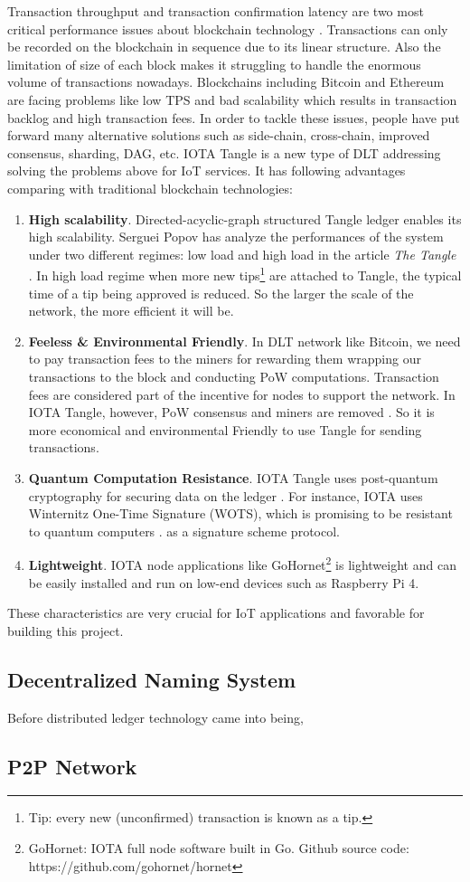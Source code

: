 Transaction throughput and transaction confirmation latency are two most critical performance issues about blockchain technology \cite{zhou2020solutions}. 
Transactions can only be recorded on the blockchain in sequence due to its linear structure. Also the limitation of size of each block makes it struggling to handle the enormous volume of transactions nowadays.
Blockchains including Bitcoin and Ethereum are facing problems like low TPS and bad scalability which results in transaction backlog and high transaction fees. 
In order to tackle these issues, people have put forward many alternative solutions such as side-chain, cross-chain, improved consensus, sharding, DAG, etc. 
IOTA Tangle is a new type of DLT addressing solving the problems above for IoT services. It has following advantages comparing with traditional blockchain technologies:

\begin{enumerate}
    \item \textbf{High scalability}. Directed-acyclic-graph structured Tangle ledger enables its high scalability. Serguei Popov has analyze the performances of the system under two different regimes: low load and high load in the article \textit{The Tangle} \cite{popov2018tangle}. In high load regime when more new tips\footnote{Tip: every new (unconfirmed) transaction is known as a tip.} are attached to Tangle, the typical time of a tip being approved is reduced. 
    So the larger the scale of the network, the more efficient it will be.
    \item \textbf{Feeless \& Environmental Friendly}. In DLT network like Bitcoin, we need to pay transaction fees to the miners for rewarding them wrapping our transactions to the block and conducting PoW computations. Transaction fees are considered part of the incentive for nodes to support the network. In IOTA Tangle, however, PoW consensus and miners are removed \cite{popov2019iota}. So it is more economical and environmental Friendly to use Tangle for sending transactions.
    \item \textbf{Quantum Computation Resistance}. IOTA Tangle uses post-quantum cryptography for securing data on the ledger \cite{tennant2017improving}. For instance, IOTA uses Winternitz One-Time Signature (WOTS), which is promising to be resistant to quantum computers \cite{buchmann2008post}. as a signature scheme protocol.
    \item \textbf{Lightweight}. IOTA node applications like GoHornet\footnote{GoHornet: IOTA full node software built in Go. Github source code: https://github.com/gohornet/hornet} is lightweight and can be easily installed and run on low-end devices such as Raspberry Pi 4.
\end{enumerate}

These characteristics are very crucial for IoT applications and favorable for building this project.


\subsection{Decentralized Naming System}
Before distributed ledger technology came into being, 

\subsection{P2P Network}


